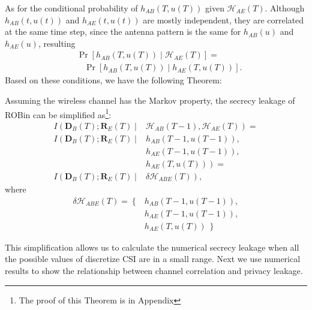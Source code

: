 As for the conditional probability of $h_{AB}\left(T, u(T)\right)$ given $\mathcal{H}_{AE}(T)$. Although $h_{AB}\left(t, u(t)\right)$ and $h_{AE}\left(t, u(t)\right)$ are mostly independent, they are correlated at the same time step, since the antenna pattern is the same for $h_{AB}(u)$ and $h_{AE}(u)$, resulting
\begin{equation*}
\begin{split}
& \Pr\left[h_{AB}\left(T, u(T)\right)\mid \mathcal{H}_{AE}(T)\right] = \\
& \ \ \ \ \Pr\left[h_{AB}\left(T, u(T) \right) \mid h_{AE}\left(T, u(T)\right)\right].
\end{split}
\end{equation*}
Based on these conditions, we have the following Theorem:
\begin{theorem}
Assuming the wireless channel has the Markov property, the secrecy leakage of ROBin can be simplified as\footnote{The proof of this Theorem is in Appendix}:
\begin{align}
    I\left(\mathbf{D}_B(T);\mathbf{R}_E(T) \mid \right. & \left. \mathcal{H}_{AB}(T-1),\mathcal{H}_{AE}(T)\right) =  \nonumber \\
    I\left(\mathbf{D}_B(T);\mathbf{R}_E(T) \mid \right. & \left. h_{AB}\left(T-1, u(T-1)\right), \right. \nonumber \\
    & \left. h_{AE}\left(T-1, u(T-1)\right), \right. \nonumber \\
    & \left. h_{AE}\left(T, u(T)\right)\right) = \nonumber \\
    I\left(\mathbf{D}_B(T);\mathbf{R}_E(T) \mid \right. & \left. \delta \mathcal{H}_{ABE}(T)\right),
\label{eq:secrecy_leakage_simplified}
\end{align}
where
\begin{align*}
\delta \mathcal{H}_{ABE}(T) = \left\{ \right. & \left. h_{AB}\left(T-1, u(T-1)\right), \right. \\
& \left. h_{AE}\left(T-1, u(T-1)\right), \right.\\
& \left. h_{AE}\left(T, u(T)\right)\ \right\}
\end{align*}
\label{corollary2}
\end{theorem}
\vspace{-15pt}
This simplification allows us to calculate the numerical secrecy leakage when all the possible values of discretize CSI are in a small range. Next we use numerical results to show the relationship between channel correlation and privacy leakage.
